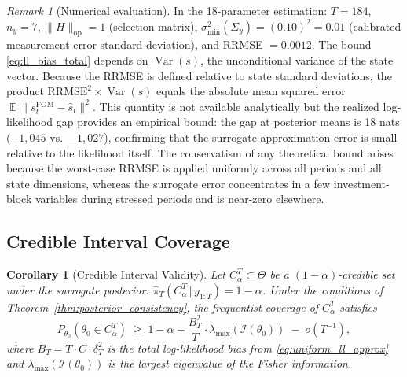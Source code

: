\documentclass[12pt]{article}
\theoremstyle{plain}
\newtheorem{corollary}[theorem]{Corollary}
\theoremstyle{definition}
\theoremstyle{remark}
\newtheorem{remark}[theorem]{Remark}
\DeclareMathOperator{\E}{\mathbb{E}}
\DeclareMathOperator{\Var}{\text{Var}}
\newcommand{\given}{\,|\,}
\newcommand{\Sigmay}{\Sigma_y}
\begin{document}
\begin{remark}[Numerical evaluation]
\label{rem:numerical_bound}
In the 18-parameter estimation: $T = 184$, $n_y = 7$, $\|H\|_{\text{op}} = 1$ (selection matrix), $\sigma_{\min}^2(\Sigmay) = (0.10)^2 = 0.01$ (calibrated measurement error standard deviation), and RRMSE $= 0.0012$. The bound \eqref{eq:ll_bias_total} depends on $\Var(s)$, the unconditional variance of the state vector. Because the RRMSE is defined relative to state standard deviations, the product $\text{RRMSE}^2 \times \Var(s)$ equals the absolute mean squared error $\E\|s_t^{\text{FOM}} - \hat{s}_t\|^2$. This quantity is not available analytically but the realized log-likelihood gap provides an empirical bound: the gap at posterior means is 18 nats ($-1{,}045$ vs.\ $-1{,}027$), confirming that the surrogate approximation error is small relative to the likelihood itself. The conservatism of any theoretical bound arises because the worst-case RRMSE is applied uniformly across all periods and all state dimensions, whereas the surrogate error concentrates in a few investment-block variables during stressed periods and is near-zero elsewhere.
\end{remark}

\subsection{Credible Interval Coverage}

\begin{corollary}[Credible Interval Validity]
\label{cor:coverage}
Let $C_\alpha^T \subset \Theta$ be a $(1-\alpha)$-credible set under the surrogate posterior: $\hat{\pi}_T(C_\alpha^T \given y_{1:T}) = 1-\alpha$. Under the conditions of Theorem~\ref{thm:posterior_consistency}, the frequentist coverage of $C_\alpha^T$ satisfies
\begin{equation}
P_{\theta_0}\!\left(\theta_0 \in C_\alpha^T\right)
  \;\geq\; 1 - \alpha - \frac{B_T^2}{T} \cdot
  \lambda_{\max}\!\left(\mathcal{I}(\theta_0)\right)
  \;-\; o(T^{-1}),
\label{eq:coverage_bound}
\end{equation}
where $B_T = T \cdot C \cdot \delta_T^2$ is the total log-likelihood bias from \eqref{eq:uniform_ll_approx} and $\lambda_{\max}(\mathcal{I}(\theta_0))$ is the largest eigenvalue of the Fisher information.
\end{corollary}
\end{document}
